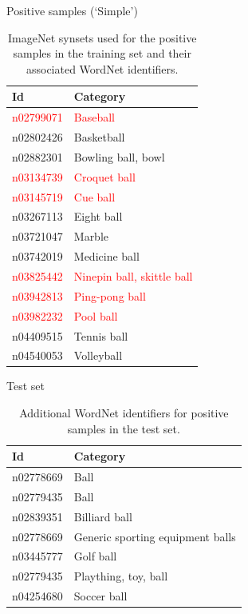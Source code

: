 \documentclass{beamer}
\newcommand{\scarequotes}[1]{`#1'}
\begin{document}
\begin{frame}{Positive samples (\scarequotes{Simple})}
	\begin{table}[H]
		\footnotesize
		\centering
		\caption{ImageNet synsets used for the positive samples in the training set and their associated WordNet \citep{fellbaum1998wordnet} identifiers.}
		\label{tab:postrainingsimple}
		\begin{tabularx}{\textwidth}{lX}
			\toprule
			\textbf{Id} & \textbf{Category} \\
			\midrule
			\textcolor{red}{n02799071} & \textcolor{red}{Baseball} \\
			n02802426 & Basketball \\
			n02882301 & Bowling ball, bowl \\
			\textcolor{red}{n03134739} & \textcolor{red}{Croquet ball} \\
			\textcolor{red}{n03145719} & \textcolor{red}{Cue ball} \\
			n03267113 & Eight ball \\
			n03721047 & Marble \\
			n03742019 & Medicine ball \\
			\textcolor{red}{n03825442} & \textcolor{red}{Ninepin ball, skittle ball} \\
			\textcolor{red}{n03942813} & \textcolor{red}{Ping-pong ball} \\
			\textcolor{red}{n03982232} & \textcolor{red}{Pool ball} \\
			n04409515 & Tennis ball \\
			n04540053 & Volleyball \\
			\bottomrule
		\end{tabularx}
	\end{table}
\end{frame}

\begin{frame}{Test set}
	\begin{table}[H]
		\centering
		\caption{Additional WordNet identifiers for positive samples in the test set.}
		\label{tab:postest}
		\begin{tabularx}{\textwidth}{lX}
			\toprule
			\textbf{Id} & \textbf{Category} \\
			\midrule
				n02778669 & Ball \\
				n02779435 & Ball \\
				n02839351 & Billiard ball \\
				n02778669 & Generic sporting equipment balls \\
				n03445777 & Golf ball \\
				n02779435 & Plaything, toy, ball \\
				n04254680 & Soccer ball \\
			\bottomrule
		\end{tabularx}
	\end{table}
\end{frame}
\end{document}
